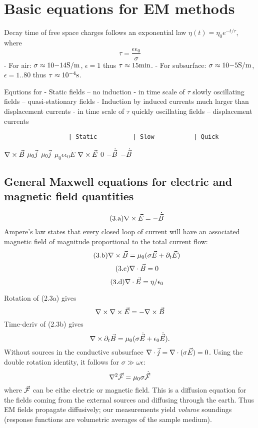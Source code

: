 \section{Basic equations for EM
methods}\label{basic-equations-for-em-methods}

Decay time of free space charges follows an exponential law
$\eta(t) = \eta_0 e^{-t/\tau}$, where \setcounter{equation}{2}\[
  \tau = \frac{\epsilon \epsilon_0}{\sigma}
\] - For air: $\sigma \approx 10{-14}\mathrm{S/m}$, $\epsilon=1$ thus
$\tau \approx 15\mathrm{min}$. - For subsurface:
$\sigma \approx 10{-5}\mathrm{S/m}$, $\epsilon=1..80$ thus
$\tau \approx 10^{-4}\mathrm{s}$.

Equtions for - Static fields -- no induction - in time scale of $\tau$
slowly oscillating fields -- quasi-stationary fields - Induction by
induced currents much larger than displacement currents - in time scale
of $\tau$ quickly oscillating fields -- displacement currents

\begin{verbatim}
                  | Static          | Slow           | Quick
\end{verbatim}

$\nabla\times\vec{B}$ \textbar{} $\mu_0\vec{j}$ \textbar{} $\mu_0\vec{j}$
\textbar{} $\mu_0\epsilon\epsilon_0\dot E$ $\nabla\times\vec{E}$
\textbar{} $0$ \textbar{} $-\dot{\vec{B}}$ \textbar{} $-\dot{\vec{B}}$

\subsection{General Maxwell equations for electric and magnetic field
quantities}\label{general-maxwell-equations-for-electric-and-magnetic-field-quantities}

\setcounter{equation}{3}\[\tag{3.a}
  \nabla\times\vec{E}  = -\dot{\vec{B}}
\] Ampere's law states that every closed loop of current will have an
associated magnetic field of magnitude proportional to the total current
flow: \setcounter{equation}{3}\[\tag{3.b}
  \nabla\times\vec{B}  = \mu_0(\sigma\vec{E} + \partial_t\vec{E})
\] \setcounter{equation}{3}\[\tag{3.c}
  \nabla\cdot\vec{B}   = 0
\] \setcounter{equation}{3}\[\tag{3.d}
  \nabla\cdot\vec{E}   = \eta/\epsilon_0
\]

Rotation of (2.3a) gives \[
  \nabla\times\nabla\times\vec{E} = -\nabla\times\vec{B}
\] Time-deriv of (2.3b) gives \[
  \nabla\times\partial_t\vec{B} = \mu_0(\sigma\dot{\vec{E}} + \epsilon_0\ddot{\vec{E}}).
\] Without sources in the conductive subsurface
$\nabla\cdot\vec{j} = \nabla\cdot(\sigma\vec{E}) = 0$. Using the double
rotation identity, it follows for $\sigma\gg\omega\epsilon$: \setcounter{equation}{6}\[
  \nabla^2\vec{\mathcal{F}} = \mu_0 \sigma \dot{\vec{\mathcal{F}}}
\] where $\vec{\mathcal{F}}$ can be eithe electric or magnetic field. This is a
diffusion equation for the fields coming from the external sources and
diffusing through the earth. Thus EM fields propagate diffusively; our
measurements yield \emph{volume} soundings (response functions are
volumetric averages of the sample medium).

